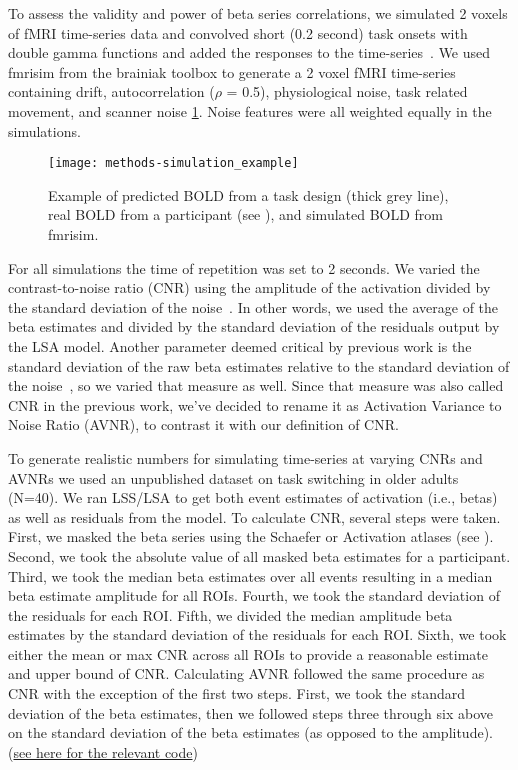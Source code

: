 \documentclass[10pt,letterpaper]{article}
\begin{document}
To assess the validity and power of beta series correlations,
we simulated 2 voxels of fMRI time-series data and convolved short (0.2 second)
task onsets with double gamma functions
and added the responses to the time-series~\cite{Glover1999,Welvaert2011}.
We used fmrisim from the brainiak toolbox\cite{Ellis2020} to generate a
2 voxel fMRI time-series containing drift, autocorrelation ($\rho$ = 0.5), physiological noise,
task related movement, and scanner noise \ref{fig:simulation_example}.
Noise features were all weighted equally in the simulations.

\begin{figure}[H]
  \centering
  \texttt{[image: methods-simulation\_example]}
  \caption{
    Example of predicted BOLD from a task design (thick grey line), real BOLD
    from a participant (see ), and simulated BOLD
    from fmrisim\cite{Ellis2020}.
  }
  \label{fig:simulation_example}
\end{figure}

For all simulations the time of repetition was set to 2 seconds.
We varied the contrast-to-noise ratio (CNR) using the amplitude of the activation
divided by the standard deviation of the noise~\cite{Welvaert2013a}.
In other words, we used the average of the beta estimates and divided by the standard
deviation of the residuals output by the LSA model.
Another parameter deemed critical by previous work is the standard deviation
of the raw beta estimates relative to the standard deviation of the noise~\cite{Abdulrahman2016},
so we varied that measure as well.
Since that measure was also called CNR in the previous work,
we've decided to rename it as Activation Variance to Noise Ratio (AVNR), to
contrast it with our definition of CNR.

To generate realistic numbers for simulating time-series at varying CNRs and AVNRs
we used an unpublished dataset on task switching in older adults (N=40).
We ran LSS/LSA to get both event estimates of activation (i.e., betas)
as well as residuals from the model.
To calculate CNR, several steps were taken.
First, we masked the beta series using the Schaefer or Activation atlases (see ).
Second, we took the absolute value of all masked beta estimates for a participant.
Third, we took the median beta estimates over all events resulting
in a median beta estimate amplitude for all ROIs.
Fourth, we took the standard deviation of the residuals for each ROI.
Fifth, we divided the median amplitude beta estimates by the standard deviation of the residuals
for each ROI.
Sixth, we took either the mean or max CNR across all ROIs to provide a reasonable estimate
and upper bound of CNR.
Calculating AVNR followed the same procedure as CNR with the exception of the first two steps.
First, we took the standard deviation of the beta estimates, then we followed steps three through six above
on the standard deviation of the beta estimates (as opposed to the amplitude).
(\href{https://github.com/jdkent/BetaSeriesRealDataAnalysis/blob/90fafb5b83b2e1bfade61a9fb1a87f225efaa95f/nibsAnalysis/cnr_trial_variability.ipynb}{see here for the relevant code})
\end{document}
